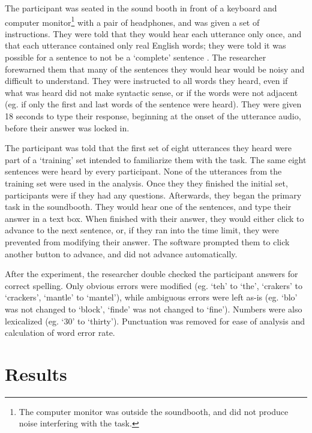 The participant was seated in the sound booth in front of a keyboard and computer monitor\footnote{The computer monitor was outside the soundbooth, and did not produce noise interfering with the task.} with a pair of headphones, and was given a set of instructions. They were told that they would hear each utterance only once, and that each utterance contained only real English words; they were told it was possible for a sentence to not be a `complete' sentence \DIFaddbegin {}\DIFaddend .  The researcher forewarned them that many of the sentences they would hear would be noisy and difficult to understand. They were instructed to \DIFdelbegin {}\DIFdelend \DIFaddbegin {}\DIFaddend all words they heard, even if what was heard did not make syntactic sense, or if the words were not adjacent (eg. if only the first and last words of the sentence were heard). They were given 18 seconds to type their response, beginning at the onset of the utterance audio, before their answer was locked in.

The participant was told that the first set of eight utterances they heard were part of a `training' set intended to familiarize them with the task. The same eight sentences were heard by every participant.  None of the utterances from the training set were used in the analysis.  Once they they finished the initial set, participants were \DIFdelbegin {}\DIFdelend \DIFaddbegin {}\DIFaddend if they had any questions.  Afterwards, they began the primary task in the soundbooth.  They would hear one of the sentences, and type their answer in a text box.  When finished with their answer, they would either click to advance to the next sentence, or, if they ran into the time limit, they were prevented from modifying their answer.  The software prompted them to click another button to advance, and did not advance automatically.

After the experiment, the researcher double checked the participant answers for correct spelling.  Only obvious errors were modified (eg. `teh' to `the', `crakers' to `crackers', `mantle' to `mantel'), while ambiguous errors were left as-is (eg. `blo' was not changed to `block', `finde' was not changed to `fine').  Numbers were also lexicalized (eg. `30' to `thirty').  Punctuation was removed for ease of analysis and calculation of word error rate.


\section{Results}
\label{chap3:results}

